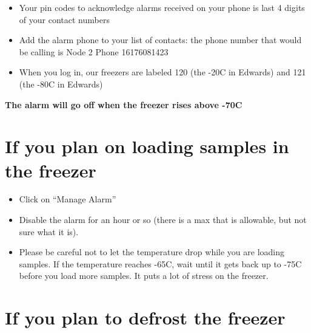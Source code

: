 \documentclass[
  letterpaper,
  DIV=11,
  numbers=noendperiod]{scrreprt}
\begin{document}

\begin{itemize}
\item
  Your pin codes to acknowledge alarms received on your phone is last 4
  digits of your contact numbers
\item
  Add the alarm phone to your list of contacts: the phone number that
  would be calling is Node 2 Phone 16176081423
\item
  When you log in, our freezers are labeled 120 (the -20C in Edwards)
  and 121 (the -80C in Edwards)
\end{itemize}

\textbf{The alarm will go off when the freezer rises above -70C}

\hypertarget{if-you-plan-on-loading-samples-in-the-freezer}{%
\section*{\texorpdfstring{\textbf{If you plan on loading samples in the
freezer}}{If you plan on loading samples in the freezer}}\label{if-you-plan-on-loading-samples-in-the-freezer}}


\begin{itemize}
\item
  Click on ``Manage Alarm''
\item
  Disable the alarm for an hour or so (there is a max that is allowable,
  but not sure what it is).
\item
  Please be careful not to let the temperature drop while you are
  loading samples. If the temperature reaches -65C, wait until it gets
  back up to -75C before you load more samples. It puts a lot of stress
  on the freezer.
\end{itemize}

\hypertarget{if-you-plan-to-defrost-the-freezer}{%
\section*{\texorpdfstring{\textbf{If you plan to defrost the
freezer}}{If you plan to defrost the freezer}}\label{if-you-plan-to-defrost-the-freezer}}

\end{document}
